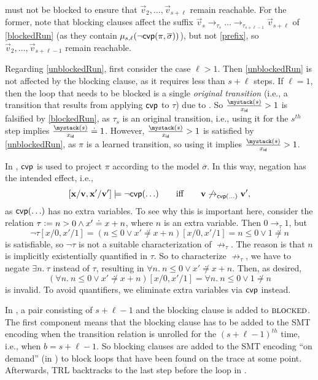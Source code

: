 \medskip
\noindent
must not be blocked to ensure that $\vec{v}_2,\ldots,\vec{v}_{s+\ell}$ remain reachable.
%
For the former, note that blocking clauses affect the suffix $\vec{v}_{s} \to_{\tau_s} \ldots \to_{\tau_{s+\ell-1}} \vec{v}_{s+\ell}$ of \eqref{blockedRun} (as they contain $\mu_{s,\ell}(\neg \mathsf{cvp}(\pi, \overline{\sigma}))$), but not \eqref{prefix}, so $\vec{v}_{2},\ldots,\vec{v}_{s+\ell-1}$ remain reachable.

Regarding \eqref{unblockedRun},\paper{ \pagebreak[3]} first consider the case $\ell > 1$.
%
Then \eqref{unblockedRun} is not affected by the blocking clause, as it requires less than $s+\ell$ steps.
%
If $\ell = 1$, then the loop that needs to be blocked is a single \emph{original transition} (i.e., a transition that results from applying $\mathsf{cvp}$ to $\tau$) due to .
%
So $\ind[\id]{x}{s} > 1$ is falsified by \eqref{blockedRun}, as $\tau_s$ is an original transition, i.e., using it for the $s^{th}$ step implies $\ind[\id]{x}{s} \doteq 1$.
%
However, $\ind[\id]{x}{s} > 1$ is satisfied by \eqref{unblockedRun}, as $\pi$ is a learned
transition, so using it implies
$\ind[\id]{x}{s} > 1$.

\begin{remark}
In , $\mathsf{cvp}$ is used to project $\pi$ according to the model $\overline{\sigma}$.
%
In this way, negation has the intended effect, i.e., 
\[
  [\bm{\mathrm{x}}/\bm{\mathrm{v}},\bm{\mathrm{x}}'/\bm{\mathrm{v}}'] \models \neg\mathsf{cvp}(\ldots) \qquad \text{iff} \qquad \bm{\mathrm{v}} \not\to_{\mathsf{cvp}(\ldots)} \bm{\mathrm{v}}',
\]
as $\mathsf{cvp}(\ldots)$ has no extra variables.
%
To see why this is important here, consider the relation $\tau \mathrel{\mathop:}= n > 0 \land x' \doteq x + n$, where $n$ is an extra variable.
%
Then $0 \to_\tau 1$, but
\[
  \neg\tau[x/0,x'/1] = (n \leq 0 \lor x' \not\doteq x + n)[x/0,x'/1] = n \leq 0 \lor 1 \not\doteq n
\]
is satisfiable, so $\neg\tau$ is not a suitable characterization of $\not\to_\tau$.
%
The reason is that $n$ is implicitly existentially quantified in $\tau$.
%
So to characterize $\not\to_\tau$, we have to negate $\exists n.\ \tau$ instead of $\tau$, resulting in $\forall n.\ n \leq 0 \lor x' \not\doteq x + n$.
%
Then, as desired,
\[
  (\forall n.\ n \leq 0 \lor x' \not\doteq x + n)[x/0,x'/1] = \forall n.\ n \leq 0 \lor 1 \not\doteq n
\]
is invalid.
%
To avoid quantifiers, we eliminate extra variables via $\mathsf{cvp}$ instead.
\end{remark}

In , a pair consisting of $s + \ell - 1$ and the blocking clause is added to $\textsc{blocked}$.
%
The first component means that the blocking clause has to be added to the SMT encoding when the transition relation is unrolled for the $(s+\ell-1)^{th}$ time, i.e., when $b = s + \ell - 1$.
%
So blocking clauses are added to the SMT encoding ``on demand'' (in ) to block
loops that have been found on the trace at some point.
%
Afterwards, TRL backtracks to the last step before the loop in .

